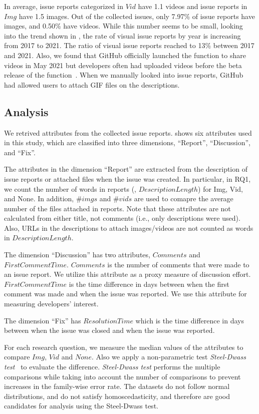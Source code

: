 
In average, issue reports categorized in $Vid$ have 1.1 videos and issue reports in $Img$ have 1.5 images.  
Out of the collected issues, only 7.97\% of issue reports have images, and 0.50\% have videos. 
While this number seems to be small, looking into the trend shown in , the rate of visual issue reports by year is increasing from 2017 to 2021. 
The ratio of visual issue reports reached to 13\% between 2017 and 2021. 
Also, we found that GitHub officially launched the function to share videos in May 2021 but developers often had uploaded videos before the beta release of the function~\citep{github-video-blog-beta}. 
When we manually looked into issue reports, GitHub had allowed users to attach GIF files on the descriptions.

% 
%

\subsection{Analysis}
We retrived attributes from the collected issue reports.  shows six attributes used in this study, which are classified into three dimensions, ``Report'', ``Discussion'', and ``Fix''. 

The attributes in the dimension ``Report'' are extracted from the description of issue reports or attached files when the issue was created. 
In particular, in RQ1, we count the number of words in reports (\ie, $DescriptionLength$) for Img, Vid, and None. In addition,  $\#imgs$ and $\#vids$ are used to comapre the average number of the files attached in reports. 
Note that these attributes are not calculated from either title, not comments (i.e., only descriptions were used). Also, URLs in the descriptions to attach images/videos are not counted as words in $DescriptionLength$.

The dimension ``Discussion'' has two attributes, $Comments$ and $FirstCommentTime$. 
$Comments$ is the number of comments that were made to an issue report. 
We utilize this attribute as a proxy measure of discussion effort. $FirstCommentTime$ is the time difference in days between when the first comment was made and when the issue was reported. 
We use this attribute for measuring developers' interest. 

The dimension ``Fix'' has $ResolutionTime$ which is the time difference in days between when the issue was closed and when the issue was reported. 

For each research question, we measure the median values of the attributes to compare $Img$, $Vid$ and $None$. 
Also we apply a non-parametric test \textit{Steel-Dwass test}~\citep{steel-dwass-test} to evaluate the difference. 
\textit{Steel-Dwass test} performs the multiple comparisons while taking into account the number of comparisons to prevent increases in the family-wise error rate.
The datasets do not follow normal distributions, and do not satisfy homoscedasticity, and therefore are good candidates for analysis using the Steel-Dwass test. 
